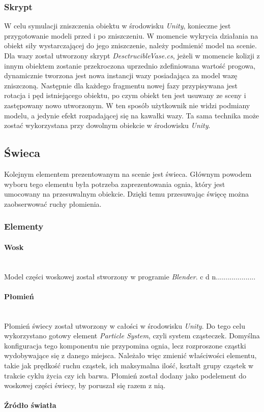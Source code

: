 \subsubsection{Skrypt}
W celu symulacji zniszczenia obiektu w środowisku \textit{Unity}, konieczne jest przygotowanie modeli przed i po zniszczeniu. W momencie wykrycia działania na obiekt siły wystarczającej do jego zniszczenie, należy podmienić model na scenie. \\
Dla wazy został utworzony skrypt \textit{DesctrucibleVase.cs}, jeżeli w momencie kolizji z innym obiektem zostanie przekroczona uprzednio zdefiniowana wartość progowa, dynamicznie tworzona jest nowa instancji wazy posiadająca za model wazę zniszczoną. Następnie dla każdego fragmentu nowej fazy przypisywana jest rotacja i pęd istniejącego obiektu, po czym obiekt ten jest usuwany ze sceny i zastępowany nowo utworzonym. W ten sposób użytkownik nie widzi podmiany modelu, a jedynie efekt rozpadającej się na kawałki wazy. Ta sama technika może zostać wykorzystana przy dowolnym obiekcie w środowisku \textit{Unity}.

\subsection{Świeca}
Kolejnym elementem prezentowanym na scenie jest świeca. Głównym powodem wyboru tego elementu była potrzeba zaprezentowania ognia, który jest umocowany na przesuwalnym obiekcie. Dzięki temu przesuwając święcę można zaobserwować ruchy płomienia.

\subsubsection{Elementy}
\paragraph{Wosk}
\mbox{}\\
Model części woskowej został stworzony w programie \textit{Blender}. 
c d n....................

\paragraph{Płomień}
\mbox{}\\
Płomień świecy został utworzony w całości w środowisku \textit{Unity}. Do tego celu wykorzystano gotowy element \textit{Particle System}, czyli system cząsteczek. Domyślna konfiguracja tego komponentu nie przypomina ognia, lecz rozproszone cząstki wydobywające się z danego miejsca. Należało więc zmienić właściwości elementu, takie jak prędkość ruchu cząstek, ich maksymalna ilość, kształt grupy cząstek w trakcie cyklu życia czy ich barwa. Płomień został dodany jako podelement do woskowej części świecy, by poruszał się razem z nią.

\paragraph{Źródło światła}